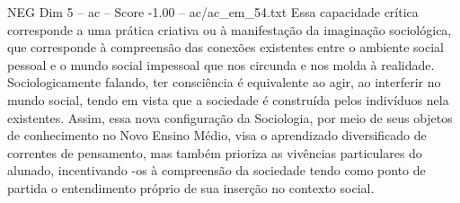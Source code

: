 \begin{textsample}{NEG Dim 5 – ac – Score -1.00 – ac/ac\_em\_54.txt}
Essa capacidade crítica corresponde a uma prática criativa ou à manifestação da imaginação sociológica, que corresponde à compreensão das conexões existentes entre o ambiente social pessoal e o mundo social impessoal que nos circunda e nos molda à realidade.
Sociologicamente falando, ter consciência é equivalente ao agir, ao interferir no mundo social, tendo em vista que a sociedade é construída pelos indivíduos nela existentes.
Assim, essa nova configuração da Sociologia, por meio de seus objetos de conhecimento no Novo Ensino Médio, visa o aprendizado diversificado de correntes de pensamento, mas também prioriza as vivências particulares do alunado, incentivando -os à compreensão da sociedade tendo como ponto de partida o entendimento próprio de sua inserção no contexto social.

\end{textsample}
